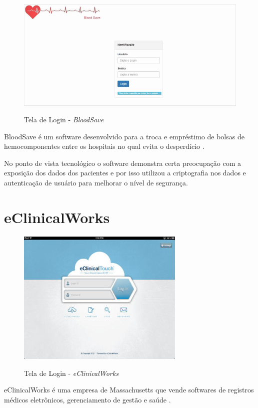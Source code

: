 \documentclass[portuguese,oneside]{tcc}
\begin{document}
\begin{figure}[htp]
\centering
\caption{Tela de Login - \textit{BloodSave}}
\includegraphics[width=15cm]{bloodsave}
\label{fig:bloodsave}
\end{figure}

BloodSave é um software desenvolvido para a troca e empréstimo de bolsas de hemocomponentes entre os hospitais no qual evita o desperdício \cite{SANGUE}.
 
No ponto de vista tecnológico o software demonstra certa preocupação com a exposição dos dados dos pacientes e por isso utilizou a criptografia nos dados e autenticação de usuário para melhorar o nível de segurança.


\section{eClinicalWorks}

\begin{figure}[htp]
\centering
\caption{Tela de Login - \textit{eClinicalWorks}}
\includegraphics[width=8cm]{eclinicalworks}
\label{fig:eclinicalworks}
\end{figure}

eClinicalWorks é uma empresa de Massachusetts que vende softwares de registros médicos eletrônicos, gerenciamento de gestão e saúde \cite{ECLINICAL}.
 
\end{document}
